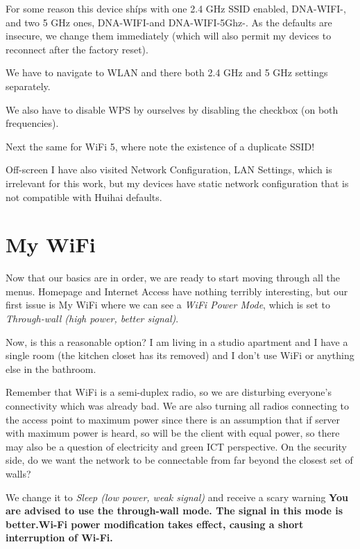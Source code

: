 \documentclass[../wifi-security.tex]{subfiles}
\begin{document}
For some reason this device shíps with one 2.4 GHz SSID enabled, DNA-WIFI-\Name, and two 5 GHz ones, DNA-WIFI-\Name and DNA-WIFI-5Ghz-\Name. As the defaults are insecure, we change them immediately (which will also permit my devices to reconnect after the factory reset).

We have to navigate to WLAN and there both 2.4 GHz and 5 GHz settings separately.

We also have to disable WPS by ourselves by disabling the checkbox (on both frequencies).


Next the same for WiFi 5, where note the existence of a duplicate SSID!

Off-screen I have also visited Network Configuration, LAN Settings, which is irrelevant for this work, but my devices have static network configuration that is not compatible with Huihai defaults.

\section{My WiFi}

Now that our basics are in order, we are ready to start moving through all the menus. Homepage and Internet Access have nothing terribly interesting, but our first issue is My WiFi where we can see a \textit{WiFi Power Mode}, which is set to \textit{Through-wall (high power, better signal)}.

Now, is this a reasonable option? I am living in a studio apartment and I have a single room (the kitchen closet has its removed) and I don't use WiFi or anything else in the bathroom.

Remember that WiFi is a semi-duplex radio, so we are disturbing everyone's connectivity which was already bad. We are also turning all radios connecting to the access point to maximum power since there is an assumption that if server with maximum power is heard, so will be the client with equal power, so there may also be a question of electricity and green ICT perspective. On the security side, do we want the network to be connectable from far beyond the closest set of walls? \autocite{metistxpower}

We change it to \textit{Sleep (low power, weak signal)} and receive a scary warning \textbf{You are advised to use the through-wall mode. The signal in this mode is better.Wi-Fi power modification takes effect, causing a short interruption of Wi-Fi.}

\end{document}
